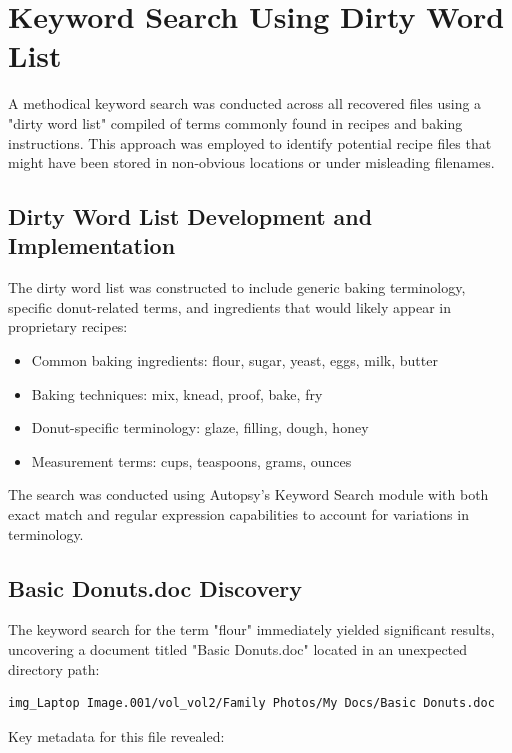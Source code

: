 \section{Keyword Search Using Dirty Word List}
A methodical keyword search was conducted across all recovered files using a "dirty word list" compiled of terms commonly found in recipes and baking instructions. This approach was employed to identify potential recipe files that might have been stored in non-obvious locations or under misleading filenames.

\subsection{Dirty Word List Development and Implementation}
The dirty word list was constructed to include generic baking terminology, specific donut-related terms, and ingredients that would likely appear in proprietary recipes:

\begin{itemize}
    \item Common baking ingredients: flour, sugar, yeast, eggs, milk, butter
    \item Baking techniques: mix, knead, proof, bake, fry
    \item Donut-specific terminology: glaze, filling, dough, honey
    \item Measurement terms: cups, teaspoons, grams, ounces
\end{itemize}

The search was conducted using Autopsy's Keyword Search module with both exact match and regular expression capabilities to account for variations in terminology.

\subsection{Basic Donuts.doc Discovery}
The keyword search for the term "flour" immediately yielded significant results, uncovering a document titled "Basic Donuts.doc" located in an unexpected directory path:

\begin{verbatim}
img_Laptop Image.001/vol_vol2/Family Photos/My Docs/Basic Donuts.doc
\end{verbatim}

Key metadata for this file revealed:

